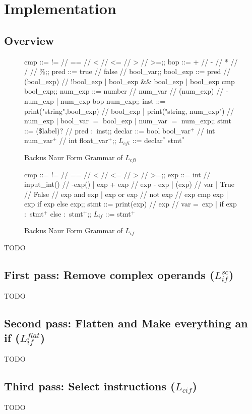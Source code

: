 \section{Implementation}

\subsection{Overview}

\begin{figure}[h]
	\centering
	\begin{bnf}[row{-} = {bg = gray9}]
		cmp ::= != // == // < // <= // > // >=;;
		bop ::= + // - // * // / // \%;;
		pred ::= true // false // bool\_var;;
		bool\_exp ::= pred // (bool\_exp) // !bool\_exp
		| bool\_exp \&\& bool\_exp
		| bool\_exp cmp bool\_exp;;
		num\_exp ::= number // num\_var // (num\_exp) // -num\_exp
		| num\_exp bop num\_exp;;
		inst ::= print("string",bool\_exp) // bool\_exp
		| print("string, num\_exp") // num\_exp
		| bool\_var $=$ bool\_exp
		| num\_var $=$ num\_exp;;
		stmt ::= (\$label)? // pred $\colon$ inst;;
		declar ::= bool bool\_var$^+$ // int num\_var$^+$ // int float\_var$^+$;;
		$L_{cfi}$ ::= declar$^*$ stmt$^*$
	\end{bnf}
	\caption{Backus Naur Form Grammar of $L_{cfi}$}
	\label{lcfi}
\end{figure}

\begin{figure}[h]
	\centering
	\begin{bnf}[row{-} = {bg = gray9}]
		cmp ::= != // == // < // <= // > // >=;;
		exp ::= int // input\_int() // -exp()
		| exp + exp // exp - exp
		| (exp) // var
		| True // False // exp and exp
		| exp or exp // not exp // exp cmp exp
		| exp if exp else exp;;
		stmt ::= print(exp) // exp // var = exp
		| if exp $\colon$ stmt$^+$ else $\colon$ stmt$^+$;;
		$L_{if}$ ::= stmt$^+$
	\end{bnf}
	\caption{Backus Naur Form Grammar of $L_{if}$}
	\label{lif}
\end{figure}
TODO

\subsection{First pass: Remove complex operands ($L_{if}^{sc}$)}

TODO

\subsection{Second pass: Flatten and Make everything an if ($L_{if}^{flat}$)}

TODO

\subsection{Third pass: Select instructions ($L_{cif}$)}

TODO
